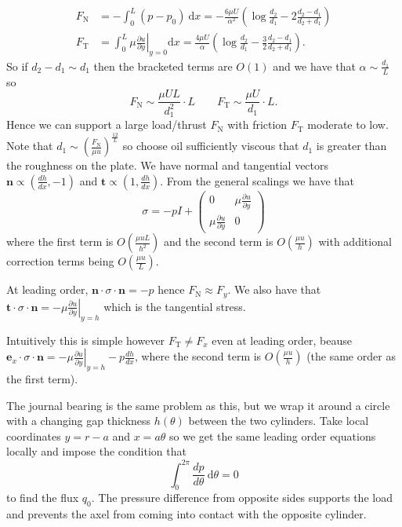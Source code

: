 \documentclass{article}
\begin{document}
\begin{align*}
	F_{\mathrm N} &= -\int_0^L (p - p_0)\ \mathrm dx = - \frac{6\mu U}{\alpha^2}\left(\log \frac{d_2}{d_1} - 2 \frac{d_2-d_1}{d_2+d_1}\right) \\
	F_{\mathrm T} &= \int_0^L \mu \left. \frac{\partial u}{\partial y}\right|_{y=0} \mathrm dx = \frac{4\mu U}\alpha\left(\log \frac{d_2}{d_1} - \frac 32 \frac{d_2 -d_1}{d_2+d_1}\right).
\end{align*}
So if $ d_2-d_1 \sim d_1 $ then the bracketed terms are $ O(1) $ and we have that $ \alpha\sim \frac{d_1}L $ so 
\[
	F_{\mathrm N} \sim \frac{\mu UL}{d_1^2} \cdot L \qquad F_{\mathrm T} \sim \frac{\mu U}{d_1} \cdot L.
\]
Hence we can support a large load/thrust $ F_{\mathrm N} $ with friction $ F_{\mathrm T} $ moderate to low. Note that $ d_1\sim \left(\frac{F_{\mathrm N}}{\mu u}\right)^\frac{12} L $ so choose oil sufficiently viscous that $ d_1  $ is greater than the roughness on the plate. We have normal and tangential vectors $ \mathbf n \propto \left(\frac{dh}{dx},-1\right) $ and $ \mathbf t \propto \left(1,\frac{dh}{dx}\right) $. From the general scalings we have that 
\[
  \sigma = -pI + \begin{pmatrix}
	  0  & \mu \frac{\partial u}{\partial y} \\
	  \mu\frac{\partial u}{\partial y} & 0
  \end{pmatrix}
\]
where the first term is $ O\left(\frac{\mu uL}{h^2}\right) $ and the second term is $ O\left(\frac{\mu u}h\right) $ with additional correction terms being $ O\left(\frac {\mu u}L\right) $.\par
At leading order, $ \mathbf n \cdot \sigma\cdot\mathbf n = -p $ hence $ F_{\mathrm N} \approx F_y $. We also have that $ \mathbf t \cdot \sigma\cdot \mathbf n = -\mu\left.\frac{\partial u}{\partial y} \right|_{y=h} $ which is the tangential stress. 
\begin{remark}
	Intuitively this is simple however $ F_{\mathrm T} \ne F_x $ even at leading order, beause $ \mathbf e_x \cdot \sigma \cdot\mathbf n =-\mu\left.\frac{\partial u}{\partial y}\right|_{y=h} -p\frac{dh}{dx}$, where the second term is $ O\left(\frac{\mu u}h\right) $ (the same order as the first term).
\end{remark}
The journal bearing is the same problem as this, but we wrap it around a circle with a changing gap thickness $ h(\theta) $ between the two cylinders. Take local coordinates $ y = r-a $ and $ x= a\theta $ so we get the same leading order equations locally and impose the condition that 
\[
	\int_0^{2\pi} \frac{dp}{d\theta} \ \mathrm d\theta = 0
\]
to find the flux $ q_0 $. The pressure difference from opposite sides supports the load and prevents the axel from coming into contact with the opposite cylinder.
\end{document}
